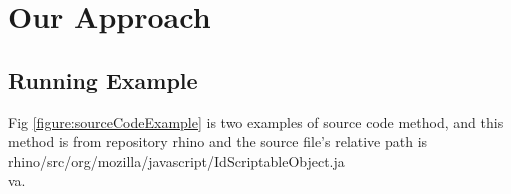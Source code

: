 \section{Our Approach}

\subsection{Running Example}

Fig \ref{figure:sourceCodeExample} is two examples of source code method, and this method is from repository rhino and the source file's relative path is rhino/src/org/mozilla/javascript/IdScriptableObject.ja\\va.




